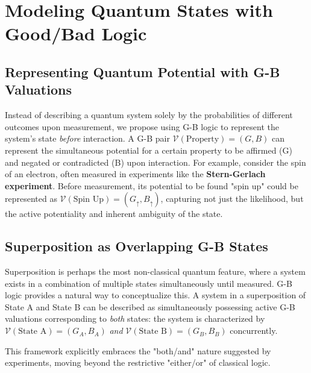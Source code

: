 \documentclass{article}
\begin{document}
\section{Modeling Quantum States with Good/Bad Logic}

\subsection{Representing Quantum Potential with G-B Valuations}

Instead of describing a quantum system solely by the probabilities of different outcomes upon measurement, we propose using G-B logic to represent the system's state \textit{before} interaction. A G-B pair $\mathcal{V}(\text{Property}) = (G, B)$ can represent the simultaneous potential for a certain property to be affirmed (G) and negated or contradicted (B) upon interaction. For example, consider the spin of an electron, often measured in experiments like the \textbf{Stern-Gerlach experiment}. Before measurement, its potential to be found "spin up" could be represented as $\mathcal{V}(\text{Spin Up}) = (G_{\uparrow}, B_{\uparrow})$, capturing not just the likelihood, but the active potentiality and inherent ambiguity of the state.

\subsection{Superposition as Overlapping G-B States}

Superposition is perhaps the most non-classical quantum feature, where a system exists in a combination of multiple states simultaneously until measured. G-B logic provides a natural way to conceptualize this. A system in a superposition of State A and State B can be described as simultaneously possessing active G-B valuations corresponding to \textit{both} states: the system is characterized by $\mathcal{V}(\text{State A}) = (G_A, B_A)$ \textit{and} $\mathcal{V}(\text{State B}) = (G_B, B_B)$ concurrently.

This framework explicitly embraces the "both/and" nature suggested by experiments, moving beyond the restrictive "either/or" of classical logic.
\end{document}

